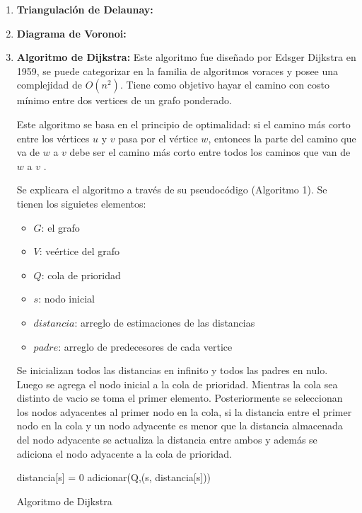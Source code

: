 \documentclass[11pt,twoside,A5]{article}
\begin{document}
\begin{enumerate}
\item \textbf{Triangulación de Delaunay:}
\item \textbf{Diagrama de Voronoi:}
\item \textbf{Algoritmo de Dijkstra:} Este algoritmo fue diseñado por Edsger Dijkstra en 1959, se puede categorizar en la familia de algoritmos voraces
y posee una complejidad de $O(n^{2})$. Tiene como objetivo hayar el camino con costo mínimo entre dos vertices de un grafo ponderado.

Este algoritmo se basa en el principio de optimalidad: si el camino más corto entre los vértices $u$ y $v$ pasa
por el vértice $w$, entonces la parte del camino que va de $w$ a $v$ debe ser el camino más corto entre todos los caminos que van de $w$ a $v$ \cite{torrubia2012}.

Se explicara el algoritmo a través de su pseudocódigo \cite{wiki2014} (Algoritmo 1).
Se tienen los siguietes elementos:

\begin{itemize}
\item $G$: el grafo
\item $V$: veértice del grafo
\item $Q$: cola de prioridad
\item $s$: nodo inicial
\item $distancia$: arreglo de estimaciones de las distancias
\item $padre$: arreglo de predecesores de cada vertice
\end{itemize}

Se inicializan todos las distancias en infinito y todos las padres en nulo. Luego se 
agrega el nodo inicial a la cola de prioridad. Mientras la cola sea distinto de 
vacio se toma el primer elemento. Posteriormente se seleccionan los
nodos adyacentes al primer nodo en la cola, si la distancia entre 
el primer nodo en la cola y un nodo adyacente es menor que la distancia 
almacenada del nodo adyacente se actualiza la distancia entre ambos y además se adiciona el nodo 
adyacente a la cola de prioridad.

\begin{algorithm}
\DontPrintSemicolon

distancia[s] = 0\;
adicionar(Q,(s, distancia[s]))\;

\caption{Algoritmo de Dijkstra \label{alg:dijkstra}}
\end{algorithm}


\end{enumerate}
\end{document}
